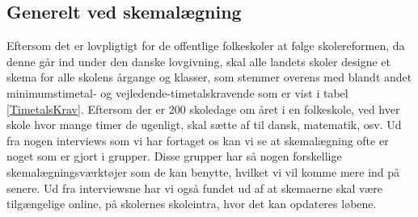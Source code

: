 \subsection{Generelt ved skemalægning}
Eftersom det er lovpligtigt for de offentlige folkeskoler at følge skolereformen, da denne går ind under den danske lovgivning, skal alle landets skoler designe et skema for alle skolens årgange og klasser, som stemmer overens med blandt andet minimumstimetal- og vejledende-timetalskravende som er vist i tabel \ref{TimetalsKrav}. Eftersom der er 200 skoledage om året i en folkeskole\cite{elevers_timetal}, ved hver skole hvor mange timer de ugenligt, skal sætte af til dansk, matematik, osv. Ud fra nogen interviews som vi har fortaget os kan vi se at skemalægning ofte er noget som er gjort i grupper. Disse grupper har så nogen forskellige skemalægningsværktøjer som de kan benytte, hvilket vi vil komme mere ind på senere. Ud fra interviewsne har vi også fundet ud af at skemaerne skal være tilgængelige online, på skolernes skoleintra, hvor det  kan opdateres løbene.

